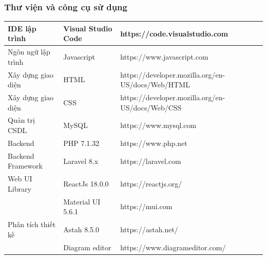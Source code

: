 \documentclass{article}
\begin{document}
\subsubsection{Thư viện và công cụ sử dụng}
    \tabletail{\hline}
    \label{bang49}
    \begin{supertabular}{| p{.30\textwidth} | p{.25\textwidth} | p{.35\textwidth} |} 
    \hline
        IDE lập trình& Visual Studio Code& https://code.visualstudio.com \\\hline
        Ngôn ngữ lập trình& Javascript& https://www.javascript.com \\\hline
        Xây dựng giao diện& HTML&https://developer.mozilla.org/en-US/docs/Web/HTML \\\hline
        Xây dựng giao diện& CSS& https://developer.mozilla.org/en-US/docs/Web/CSS \\\hline
        Quản trị CSDL& MySQL& https://www.mysql.com \\\hline
        Backend& PHP 7.1.32& https://www.php.net\\\hline
        Backend Framework& Laravel 8.x& https://laravel.com \\\hline
        Web UI Library& ReactJs 18.0.0&https://reactjs.org/\\\hline
                      & Material UI 5.6.1&https://mui.com \\\hline
        Phân tích thiết kế& Astah 8.5.0 & https://astah.net/ \\\hline
                          & Diagram editor& https://www.diagrameditor.com/ \\\hline
    \end{supertabular}
\end{document}
